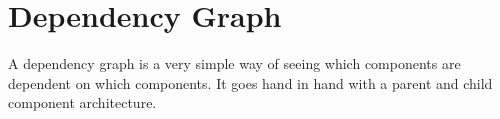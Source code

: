 \maketitle{}
\section{ Dependency Graph }

A dependency graph is a very simple way of seeing which components are
dependent on which components. It goes hand in hand with a parent and child
component architecture.
